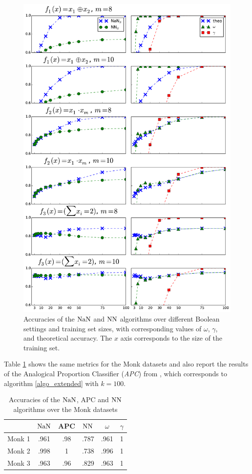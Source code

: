 \begin{figure}[h!]
\caption{Accuracies of the $\mbox{NaN}$ and $\mbox{NN}$ algorithms  over different Boolean
  settings and training set sizes, with corresponding values of $\omega$,
  $\gamma$, and theoretical accuracy. The $x$ axis corresponds to the size of
the training set.}
\label{plots}
\includegraphics[width=\linewidth ]{figures/ecai_plots.pdf}
\end{figure}

Table \ref{TABLE_MONK} shows the same metrics for the Monk datasets and
also report the results of the Analogical Proportion Classifier (\textit{APC})
from \cite{MicBayDelJAIR08}, which corresponds to algorithm
\ref{algo_extended} with $k=100$.

\begin{table}
\centering
\caption{Accuracies of the $\mbox{NaN}$, APC and $\mbox{NN}$ algorithms over the Monk datasets}
\label{TABLE_MONK}
\begin{tabular}{| c | c | c | c | c | c |}
\toprule
& $\mbox{NaN}$  & APC & $\mbox{NN}$  &  $\omega$ & $\gamma$ \\
\midrule
Monk 1 & .961 & .98 & .787 &   .961    &   1 \\
Monk 2 & .998 & 1 & .738 &    .996    &   1 \\
Monk 3 & .963 & .96 & .829 &   .963    &   1 \\
\bottomrule
\end{tabular}
\end{table}

